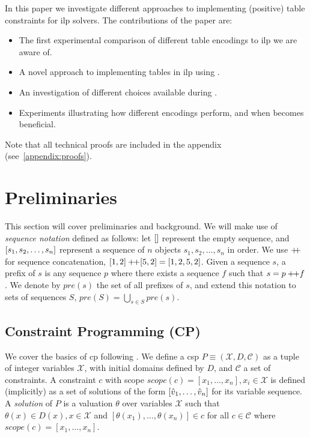\documentclass[a4paper,UKenglish,cleveref,autoref,thm-restate]{lipics-v2021}
\newcommand{\milp}{\gls{ilp}\xspace}
\begin{document}
In this paper we investigate different approaches to implementing (positive) table constraints for \milp solvers. The contributions of the paper are:
\begin{itemize}
    \item The first experimental comparison of different table encodings to \milp we are aware of.
    \item A novel approach to implementing tables in \milp using .
    \item An investigation of different choices available during 
    . 
    \item Experiments illustrating how different encodings perform, and when  becomes beneficial.
\end{itemize}

Note that all technical proofs are included in the appendix (see~\cref{appendix:proofs}).


\section{Preliminaries}
\label{sec:prelim}

This section will cover preliminaries and background.
We will make use of \emph{sequence notation} defined as follows: let $[]$ represent the empty sequence, and $[s_1, s_2, \ldots, s_n]$ represent a sequence of $n$ objects $s_1, s_2, \ldots, s_n$ in order.
We use $+\!\!+$ for sequence concatenation, \eg $[1,2] +\!\!+ [5,2] = [1,2,5,2]$.
Given a sequence $s$, a prefix of $s$ is any sequence $p$ where there exists a sequence $f$ such that $s = p +\!\!+ f$.
We denote by $pre(s)$ the set of all prefixes of $s$, and extend this notation to sets of sequences $S$, $pre(S) = \bigcup_{s \in S} pre(s)$. 

\subsection{Constraint Programming (CP)}

We cover the basics of \gls{cp} following .
We define a \gls{csp} $P \equiv (\mathcal{X},D,\mathcal{C})$ as a tuple of integer variables $\mathcal{X}$, with initial domains defined by $D$, and $\mathcal{C}$ a set of constraints. 
A constraint $c$ with scope $scope(c) = [x_1, \ldots, x_n], x_i \in \mathcal{X}$ is defined (implicitly) as a  set of solutions of the form
$[\hat{v}_1, \ldots, \hat{v}_n]$ for its variable sequence.
A \emph{solution} of $P$ is a valuation $\theta$ over variables $\mathcal{X}$ such that $\theta(x) \in D(x), x \in \mathcal{X}$ and $[\theta(x_1), \ldots, \theta(x_n)] \in c$ for all $c \in \mathcal{C}$ where $scope(c) = [x_1, \ldots, x_n]$. 
\end{document}
